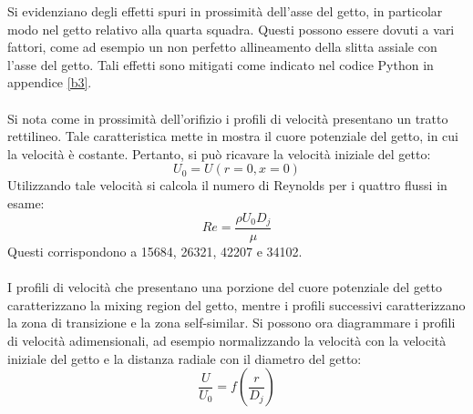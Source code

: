 \noindent Si evidenziano degli effetti spuri in prossimità dell'asse del getto, in particolar modo nel getto relativo alla quarta squadra. Questi possono essere dovuti a vari fattori, come ad esempio un non perfetto allineamento della slitta assiale con l'asse del getto. Tali effetti sono mitigati come indicato nel codice Python in appendice \ref{b3}.\\\\
Si nota come in prossimità dell'orifizio i profili di velocità presentano un tratto rettilineo. Tale caratteristica mette in mostra il cuore potenziale del getto, in cui la velocità è costante. Pertanto, si può ricavare la velocità iniziale del getto:
\begin{equation*}
    U_0 = U(r=0, x=0)
\end{equation*}
Utilizzando tale velocità si calcola il numero di Reynolds per i quattro flussi in esame:
\begin{equation*}
    Re = \frac{\rho U_0 D_j}{\mu}
\end{equation*}
Questi corrispondono a 15684, 26321, 42207 e 34102.\\\\
I profili di velocità che presentano una porzione del cuore potenziale del getto caratterizzano la mixing region del getto, mentre i profili successivi caratterizzano la zona di transizione e la zona self-similar.
\newpage
\noindent Si possono ora diagrammare i profili di velocità adimensionali, ad esempio normalizzando la velocità con la velocità iniziale del getto e la distanza radiale con il diametro del getto:
\begin{equation*}
    \frac U {U_0} = f\left(\frac r{D_j} \right)
\end{equation*}
